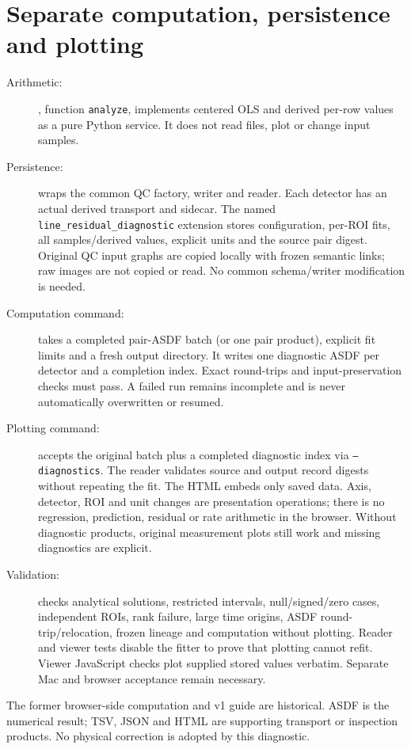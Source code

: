 \documentclass[10pt,a4paper]{article}
\begin{document}
\section{Separate computation, persistence and plotting}
\begin{description}
\item[Arithmetic:] , function \texttt{analyze}, implements
centered OLS and derived per-row values as a pure Python service. It does not
read files, plot or change input samples.
\item[Persistence:]  wraps the common QC factory,
writer and reader. Each detector has an actual derived
 transport and  sidecar.
The named \texttt{line\_residual\_diagnostic} extension stores configuration,
per-ROI fits, all samples/derived values, explicit units and the source pair digest.
Original QC input graphs are copied locally with frozen semantic links; raw
images are not copied or read. No common schema/writer modification is needed.
\item[Computation command:]  takes a completed
pair-ASDF batch (or one pair product), explicit fit limits and a fresh output
directory. It writes one diagnostic ASDF per detector and a completion index.
Exact round-trips and input-preservation checks must pass. A failed run remains
incomplete and is never automatically overwritten or resumed.
\item[Plotting command:]  accepts the original batch
plus a completed diagnostic index via \texttt{--diagnostics}. The reader validates
source and output record digests without repeating the fit. The HTML embeds only
saved data. Axis, detector, ROI and unit changes are presentation operations;
there is no regression, prediction, residual or rate arithmetic in the browser.
Without diagnostic products, original measurement plots still work and missing
diagnostics are explicit.
\item[Validation:]  checks analytical solutions,
restricted intervals, null/signed/zero cases, independent ROIs, rank failure,
large time origins, ASDF round-trip/relocation, frozen lineage and computation
without plotting. Reader and viewer tests disable the fitter to prove that
plotting cannot refit. Viewer JavaScript checks plot supplied stored values
verbatim. Separate Mac and browser acceptance remain necessary.
\end{description}
\noindent The former browser-side computation and v1 guide are historical.
ASDF is the numerical result; TSV, JSON and HTML are supporting transport or
inspection products. No physical correction is adopted by this diagnostic.
\end{document}
